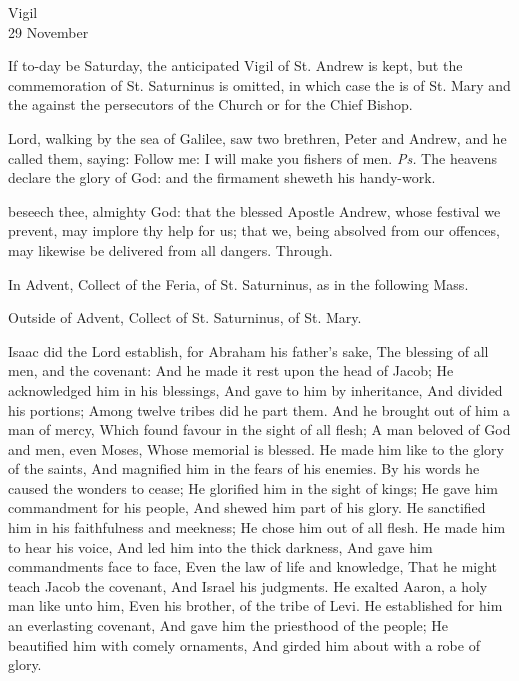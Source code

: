 {}


\begin{inhead}
    {Vigil\\
29 November}
\end{inhead}

\begin{rubric}
	If to-day be Saturday, the anticipated Vigil of St. Andrew is kept, but the commemoration of St. Saturninus is omitted, in which case the  is of St. Mary and the  against the persecutors of the Church or for the Chief Bishop.
\end{rubric}

\introit
{} Lord, walking by the sea of Galilee, saw two brethren, Peter and Andrew, and he called them, saying: Follow me: I will make you fishers of men. \textit{Ps.} The heavens declare the glory of God: and the firmament sheweth his handy-work.

\collect
{} beseech thee, almighty God: that the blessed Apostle Andrew, whose festival we prevent, may implore thy help for us; that we, being absolved from our offences, may likewise be delivered from all dangers. Through.

\begin{rubric}
	In Advent,  Collect of the Feria,  of St. Saturninus, as in the following Mass.
\end{rubric}
\begin{rubric}
	Outside of Advent,  Collect of St. Saturninus,  of St. Mary.
\end{rubric}

 Isaac did the Lord establish, for Abraham his father's sake, The blessing of all men, and the covenant: And he made it rest upon the head of Jacob; He acknowledged him in his blessings, And gave to him by inheritance, And divided his portions; Among twelve tribes did he part them. And he brought out of him a man of mercy, Which found favour in the sight of all flesh; A man beloved of God and men, even Moses, Whose memorial is blessed. He made him like to the glory of the saints, And magnified him in the fears of his enemies. By his words he caused the wonders to cease; He glorified him in the sight of kings; He gave him commandment for his people, And shewed him part of his glory. He sanctified him in his faithfulness and meekness; He chose him out of all flesh. He made him to hear his voice, And led him into the thick darkness, And gave him commandments face to face, Even the law of life and knowledge, That he might teach Jacob the covenant, And Israel his judgments. He exalted Aaron, a holy man like unto him, Even his brother, of the tribe of Levi. He established for him an everlasting covenant, And gave him the priesthood of the people; He beautified him with comely ornaments, And girded him about with a robe of glory.

